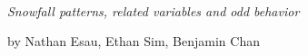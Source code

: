 \begin{titlepage}
\newcommand{\HRule}{\rule{\linewidth}{0.5mm}} 

\center %



{ \huge \bfseries \color{black}{Analysis of whistler weather data}}\\[0.4cm] 

{\large
\textsl{Snowfall patterns, related variables and odd behavior}}

\bigskip
{\large
by Nathan Esau, Ethan Sim, Benjamin Chan}



\end{titlepage}